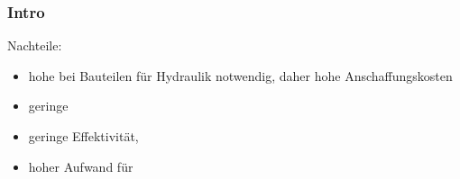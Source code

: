 \begin{frame}
  \frametitle{Intro}
  
  Nachteile:
  \begin{itemize}
    \item hohe  bei Bauteilen für Hydraulik notwendig, 
      daher hohe Anschaffungskosten
    \item geringe 
    \item geringe Effektivität,  
    \item hoher Aufwand für 
  \end{itemize}
  
   \ifteacher%
   \else%
     \vspace*{-1.0\baselineskip}\rotatebox[origin=lB]{180}{%
     \resizebox{0.9\linewidth}{!}{\parbox[t]{3.95\linewidth}{%
       Pr\"azision, \"Ubertragungsentfernungen, Schlupf, Umweltschutz
     }}}
   \fi%
  

\end{frame}

